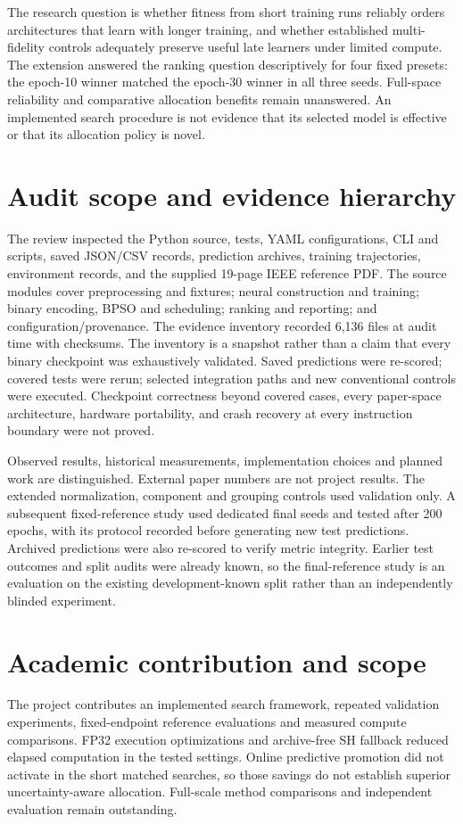 \documentclass[11pt,a4paper]{report}
\begin{document}
The research question is whether fitness from short training runs reliably orders architectures that learn with longer training, and whether established multi-fidelity controls adequately preserve useful late learners under limited compute. The extension answered the ranking question descriptively for four fixed presets: the epoch-10 winner matched the epoch-30 winner in all three seeds. Full-space reliability and comparative allocation benefits remain unanswered. An implemented search procedure is not evidence that its selected model is effective or that its allocation policy is novel.

\section{Audit scope and evidence hierarchy}
The review inspected the Python source, tests, YAML configurations, CLI and scripts, saved JSON/CSV records, prediction archives, training trajectories, environment records, and the supplied 19-page IEEE reference PDF. The source modules cover preprocessing and fixtures; neural construction and training; binary encoding, BPSO and scheduling; ranking and reporting; and configuration/provenance. The evidence inventory recorded 6,136 files at audit time with checksums. The inventory is a snapshot rather than a claim that every binary checkpoint was exhaustively validated. Saved predictions were re-scored; covered tests were rerun; selected integration paths and new conventional controls were executed. Checkpoint correctness beyond covered cases, every paper-space architecture, hardware portability, and crash recovery at every instruction boundary were not proved.

Observed results, historical measurements, implementation choices and planned work are distinguished. External paper numbers are not project results. The extended normalization, component and grouping controls used validation only. A subsequent fixed-reference study used dedicated final seeds and tested after 200 epochs, with its protocol recorded before generating new test predictions. Archived predictions were also re-scored to verify metric integrity. Earlier test outcomes and split audits were already known, so the final-reference study is an evaluation on the existing development-known split rather than an independently blinded experiment.

\section{Academic contribution and scope}
The project contributes an implemented search framework, repeated validation experiments, fixed-endpoint reference evaluations and measured compute comparisons. FP32 execution optimizations and archive-free SH fallback reduced elapsed computation in the tested settings. Online predictive promotion did not activate in the short matched searches, so those savings do not establish superior uncertainty-aware allocation. Full-scale method comparisons and independent evaluation remain outstanding.
\end{document}
